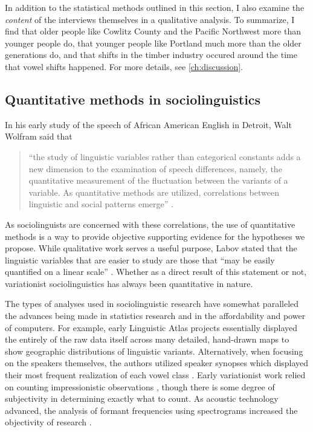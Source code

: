 In addition to the statistical methods outlined in this section, I also examine the \textit{content} of the interviews themselves in a qualitative analysis. To summarize, I find that older people like Cowlitz County and the Pacific Northwest more than younger people do, that younger people like Portland much more than the older generations do, and that shifts in the timber industry occured around the time that vowel shifts happened. For more details, see \ref{ch:discussion}.

\subsection{Quantitative methods in sociolinguistics}
\label{quantitative_methods_sociolinguistics}

In his early study of the speech of African American English in Detroit, Walt Wolfram said that
\begin{quote}
    ``the study of linguistic variables rather than categorical constants adds a new dimension to the examination of speech differences, namely, the quantitative measurement of the fluctuation between the variants of a variable. As quantitative methods are utilized, correlations between linguistic and social patterns emerge'' \citep[47]{wolfram_1969}.
\end{quote}
As sociolinguists are concerned with these correlations, the use of quantitative methods is a way to provide objective supporting evidence for the hypotheses we propose. While qualitative work serves a useful purpose, Labov stated that the linguistic variables that are easier to study are those that ``may be easily quantified on a linear scale'' \citeyearpar[32]{labov_2006}. Whether as a direct result of this statement or not, variationist sociolinguistics has always been quantitative in nature.

The types of analyses used in sociolinguistic research have somewhat paralleled the advances being made in statistics research and in the affordability and power of computers. For example, early Linguistic Atlas projects \citep{kurath_1939_lane} essentially displayed the entirely of the raw data itself across many detailed, hand-drawn maps to show geographic distributions of linguistic variants. Alternatively, when focusing on the speakers themselves, the authors utilized speaker synopses which displayed their most frequent realization of each vowel class \citep{kurath_mcdavid_1961}. Early variationist work relied on counting  impressionistic observations \citep{labov_2006, wolfram_1969}, though there is some degree of subjectivity in determining exactly what to count. As acoustic technology advanced, the analysis of formant frequencies using spectrograms increased the objectivity of research \citep{peterson_barney_1952, labov_1972_LYS}.

